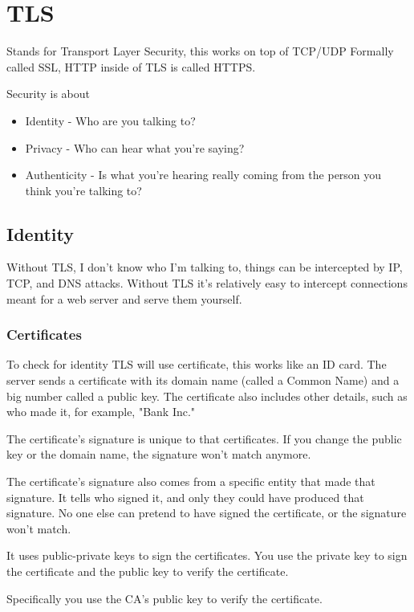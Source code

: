 \documentclass[../CMPUT-404-Notes.tex]{subfiles}
\begin{document}
\chapter{TLS}
Stands for Transport Layer Security, this works on top of TCP/UDP
Formally called SSL, HTTP inside of TLS is called HTTPS.

Security is about 
\begin{itemize}
  \item Identity - Who are you talking to?
  \item Privacy - Who can hear what you're saying?
  \item Authenticity - Is what you're hearing really coming from the person you think you're talking to?
\end{itemize}

\section{Identity}
Without TLS, I don't know who I'm talking to, things can be intercepted by IP, TCP, and DNS attacks. Without TLS it's relatively easy to intercept connections meant for a web server and serve them yourself.

\subsection{Certificates}
To check for identity TLS will use certificate, this works like an ID card. The server sends a certificate with its domain name (called a Common Name) and a big number called a public key. The certificate also includes other details, such as who made it, for example, "Bank Inc."

The certificate's signature is unique to that certificates. If you change the public key or the domain name, the signature won't match anymore.

The certificate's signature also comes from a specific entity that made that signature. 
It tells who signed it, and only they could have produced that signature.
No one else can pretend to have signed the certificate, or the signature won't match.

It uses public-private keys to sign the certificates. You use the private key to sign the certificate and the public key to verify the certificate.

Specifically you use the CA's public key to verify the certificate.
\end{document}

